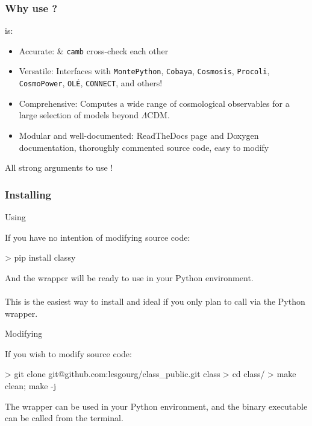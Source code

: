 \begin{frame}[fragile]
	\frametitle{Why use \CLASS{}?}
	\CLASS{} is:
	\vspace{0.5\baselineskip}
	\begin{itemize}
		\item Accurate: \CLASS{} \& \texttt{camb} cross-check each other
		\item Versatile: Interfaces with \texttt{MontePython}, \texttt{Cobaya}, \texttt{Cosmosis}, \texttt{Procoli}, \texttt{CosmoPower}, \texttt{OL\'E}, \texttt{CONNECT}, and others!
		\item Comprehensive: Computes a wide range of cosmological observables for a large selection of models beyond $\Lambda$CDM.
		\item Modular and well-documented: ReadTheDocs page and Doxygen documentation, thoroughly commented source code, easy to modify
	\end{itemize}
	All strong arguments to use {\Red \CLASS{}}!\\

\end{frame}

\begin{frame}[fragile]
	\frametitle{Installing \CLASS{}}

	\begin{minipage}[t][0.8\textheight][t]{.45\textwidth}
      \begin{block}{Using \CLASS{}}
		\begin{minipage}[t][0.42\textheight][t]{\textwidth}
        If you have no intention of modifying source code:
		\begin{class}
> pip install classy
		\end{class}
		And the \CLASS{} wrapper will be ready to use in your Python environment.\\
		\\
		This is the easiest way to install and ideal if you only plan to call \CLASS{} via the Python wrapper.
		\end{minipage}
      \end{block}
	  \end{minipage}
	  \hfill
	\begin{minipage}[t][0.8\textheight][t]{.45\textwidth}
      \begin{block}{Modifying \CLASS{}}
		\begin{minipage}[t][0.42\textheight][t]{\textwidth}
		If you wish to modify source code:
        \begin{class}
> git clone git@github.com:lesgourg/class_public.git class
> cd class/
> make clean; make -j
		\end{class}
	  The wrapper can be used in your Python environment, and the binary executable can be called from the terminal.
	  \end{minipage}
      \end{block}
	  \end{minipage}

\end{frame}

